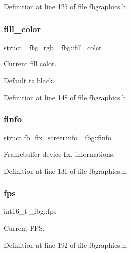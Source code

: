 Definition at line 126 of file fbgraphics.\+h.

\mbox{\label{struct__fbg_ad3cac82bd9448a4020a4e08621f5269a}} 
\subsubsection{\texorpdfstring{fill\+\_\+color}{fill\_color}}
{\footnotesize\ttfamily struct \mbox{\hyperlink{fbgraphics_8h_struct__fbg__rgb}{\+\_\+fbg\+\_\+rgb}} \+\_\+fbg\+::fill\+\_\+color}



Current fill color. 

Default to black. 

Definition at line 148 of file fbgraphics.\+h.

\mbox{\label{struct__fbg_a954dd14a4129eed7ebe09f31bd025861}} 
\subsubsection{\texorpdfstring{finfo}{finfo}}
{\footnotesize\ttfamily struct fb\+\_\+fix\+\_\+screeninfo \+\_\+fbg\+::finfo}



Framebuffer device fix. informations. 



Definition at line 131 of file fbgraphics.\+h.

\mbox{\label{struct__fbg_a64b16363bc48d1e19141df2e242930a9}} 
\subsubsection{\texorpdfstring{fps}{fps}}
{\footnotesize\ttfamily int16\+\_\+t \+\_\+fbg\+::fps}



Current F\+PS. 



Definition at line 192 of file fbgraphics.\+h.

\mbox{\label{struct__fbg_af447e6ed58d893989c8dad075807a79b}} 
